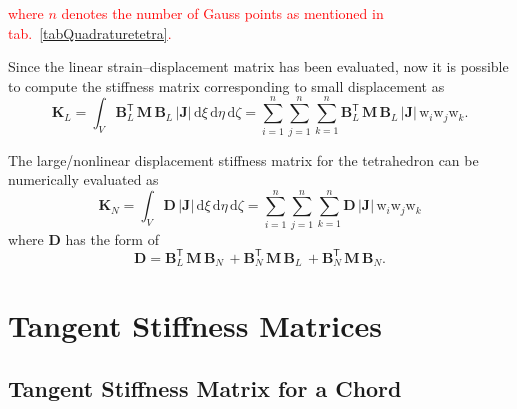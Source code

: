 \textcolor{red}{where $n$ denotes the number of Gauss points as mentioned in  tab.~\ref{tabQuadraturetetra}.}

Since the linear strain--displacement matrix has been evaluated, now it is possible to compute the  stiffness matrix corresponding to small displacement as 
\begin{equation}
\mathbf{K}_{L} = \int_{V} \mathbf{B}_L^{\mathsf{T}} \, \mathbf{M} \, \mathbf{B}_L \, |\mathbf{J}| \,  \mathrm{d} \xi \,  \mathrm{d} \eta \,  \mathrm{d} \zeta =  \sum_{i=1}^{n}  \sum_{j=1}^{n}  \sum_{k=1}^{n}  \mathbf{B}_L^{\mathsf{T}} \, \mathbf{M} \, \mathbf{B}_L \, |\mathbf{J}|  \, \mathrm{w}_i \mathrm{w}_j \mathrm{w}_k.
\end{equation}

The large/nonlinear displacement stiffness matrix for the tetrahedron can be numerically evaluated as
\begin{equation}
\mathbf{K}_{N} = \int_{V} \mathbf{D} \, |\mathbf{J}|\, \mathrm{d} \xi \, \mathrm{d} \eta \, \mathrm{d} \zeta
= \sum_{i=1}^{n}  \sum_{j=1}^{n}  \sum_{k=1}^{n}  \mathbf{D} \, |\mathbf{J}| \, \mathrm{w}_i \mathrm{w}_j \mathrm{w}_k
\end{equation}
where $\mathbf{D}$ has the form of 
\begin{equation}
\mathbf{D} = \mathbf{B}_L^{\mathsf{T}} \, \mathbf{M} \, \mathbf{B}_N \, + \mathbf{B}_N^{\mathsf{T}} \, \mathbf{M} \, \mathbf{B}_L \, + \mathbf{B}_N^{\mathsf{T}} \, \mathbf{M} \, \mathbf{B}_N.
\end{equation}



































\section{Tangent Stiffness Matrices}
\label{secTangentStiffnessMatrices}


\subsection{Tangent Stiffness Matrix for a Chord}

